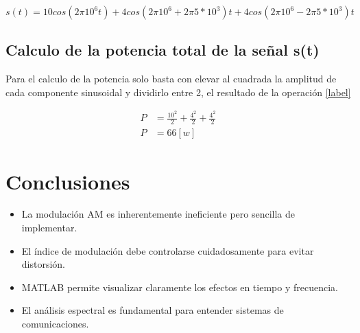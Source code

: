 \documentclass[conference]{IEEEtran}
\begin{document}
	\begin{equation}
		s(t) = 10cos(2\pi10^6t) + 4cos(2\pi10^6 + 2\pi5*10^3)t + 4cos(2\pi10^6 - 2\pi5*10^3)t
	\end{equation}
	
	\subsection{Calculo de la potencia total de la señal s(t)}
	
	Para el calculo de la potencia solo basta con elevar al cuadrada la amplitud de cada componente sinusoidal y dividirlo entre 2, el resultado de la operación \ref{label}
	
	\begin{align}
		P &= \frac{10^2}{2} + \frac{4^2}{2} + \frac{4^2}{2}\\
		P &= 66 [w]
	\end{align}
	
	\section{Conclusiones}
	
	\begin{itemize}
		\item La modulación AM es inherentemente ineficiente pero sencilla de implementar.
		\item El índice de modulación debe controlarse cuidadosamente para evitar distorsión.
		\item MATLAB permite visualizar claramente los efectos en tiempo y frecuencia.
		\item El análisis espectral es fundamental para entender sistemas de comunicaciones.
	\end{itemize}
	
	
	
\end{document}
